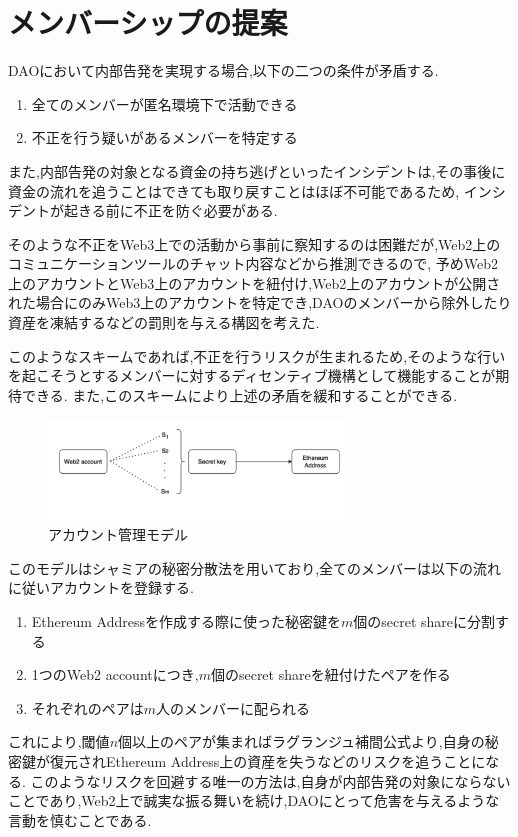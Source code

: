 \documentclass[twocolumn,a4j]{jarticle}
\begin{document}
\section{メンバーシップの提案}
DAOにおいて内部告発を実現する場合,以下の二つの条件が矛盾する.
\begin{enumerate}
  \item 全てのメンバーが匿名環境下で活動できる
  \item 不正を行う疑いがあるメンバーを特定する
\end{enumerate}
また,内部告発の対象となる資金の持ち逃げといったインシデントは,その事後に資金の流れを追うことはできても取り戻すことはほぼ不可能であるため,
インシデントが起きる前に不正を防ぐ必要がある.

そのような不正をWeb3上での活動から事前に察知するのは困難だが,Web2上のコミュニケーションツールのチャット内容などから推測できるので,
予めWeb2上のアカウントとWeb3上のアカウントを紐付け,Web2上のアカウントが公開された場合にのみWeb3上のアカウントを特定でき,DAOのメンバーから除外したり資産を凍結するなどの罰則を与える構図を考えた.

このようなスキームであれば,不正を行うリスクが生まれるため,そのような行いを起こそうとするメンバーに対するディセンティブ機構として機能することが期待できる.
また,このスキームにより上述の矛盾を緩和することができる.
\begin{figure}[htbp]
  \begin{center}
    \includegraphics[width=80mm]{account.png}
    \caption{アカウント管理モデル}
  \end{center}
\end{figure}
このモデルはシャミアの秘密分散法を用いており,全てのメンバーは以下の流れに従いアカウントを登録する.
\begin{enumerate}
  \item Ethereum Addressを作成する際に使った秘密鍵を$m$個のsecret shareに分割する
  \item 1つのWeb2 accountにつき,$m$個のsecret shareを紐付けたペアを作る
  \item それぞれのペアは$m$人のメンバーに配られる
\end{enumerate}
これにより,閾値$n$個以上のペアが集まればラグランジュ補間公式より,自身の秘密鍵が復元されEthereum Address上の資産を失うなどのリスクを追うことになる.
このようなリスクを回避する唯一の方法は,自身が内部告発の対象にならないことであり,Web2上で誠実な振る舞いを続け,DAOにとって危害を与えるような言動を慎むことである.
\end{document}
